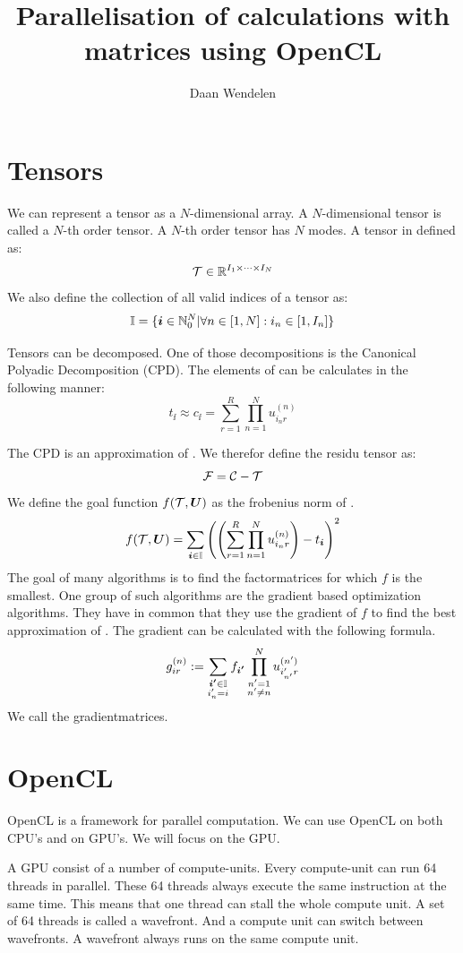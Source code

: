 \documentclass[11pt]{IEEEtran}
\title{Parallelisation of calculations with matrices using OpenCL}
\author{Daan Wendelen}
\begin{document}
\maketitle

\section{Tensors}
We can represent a tensor as a $N$-dimensional array. A $N$-dimensional tensor is called a $N$-th order tensor. A $N$-th order tensor has $N$ modes. A tensor in defined as:
\[
	\mathcal{T} \in \mathbb{R}^{I_1 \times \dotsb \times I_N}
\]
We also define the collection of all valid indices of a tensor as:
\[
    \mathbb{I} = \{\boldsymbol{i}{} \in \mathbb{N}_0^N | \forall n \in [1, N]: i_n \in [1, I_n]\}
\]

Tensors can be decomposed. One of those decompositions is the Canonical Polyadic Decomposition (CPD). The elements of \TT{} can be calculates in the following manner: 
\[
    t_{\ii{}} \approx c_{\ii{}} = \sum_{r=1}^{R} \prod_{n=1}^{N} u^{(n)}_{i_{n}r}
\]

The CPD \CC{} is an approximation of \TT{}. We therefor define the residu tensor as:
\[
    \mathcal{F} = \mathcal{C} - \mathcal{T}
\]
We define the goal function $f(\mathcal{T}, \boldsymbol{U})$ as the frobenius norm of \FF{}.
\[
    f(\mathcal{T}, \boldsymbol{U}) = \sum_{\boldsymbol{i}{} \in \mathbb{I}} \left( \left( \sum_{r=1}^{R} \prod_{n=1}^{N} u^{(n)}_{i_{n}r} \right) - t_{\boldsymbol{i}{}} \right)^2
\]
The goal of many algorithms is to find the factormatrices \UUU{} for which $f$ is the smallest. One group of such algorithms are the gradient based optimization algorithms. They have in common that they use the gradient of $f$ to find the best approximation of \TT. The gradient can be calculated with the following formula.
\[
    g^{(n)}_{ir} :=\sum_{\substack{\boldsymbol{i'}{} \in \mathbb{I}\\ i'_n = i}} f_{\boldsymbol{i'}{}} \prod_{\substack{n'=1\\n'\neq n}}^{N} u^{(n')}_{i'_{n'}r}
\]
We call \GGG{} the gradientmatrices.

\section{OpenCL}
OpenCL is a framework for parallel computation. We can use OpenCL on both CPU's and on GPU's. We will focus on the GPU.

A GPU consist of a number of compute-units. Every compute-unit can run 64 threads in parallel. These 64 threads always execute
the same instruction at the same time. This means that one thread can stall the whole compute unit. A set of 64 threads is called a wavefront. And a compute unit can switch between wavefronts. A wavefront always runs on the same compute unit.
\end{document}
